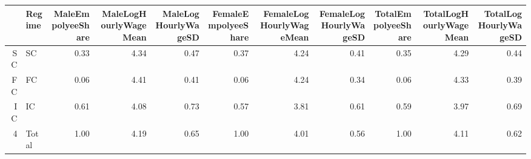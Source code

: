 \begin{table}[ht]
\centering
\begin{tabular}{rlrrrrrrrrr}
  \hline
 & Regime & MaleEmpolyeeShare & MaleLogHourlyWageMean & MaleLogHourlyWageSD & FemaleEmpolyeeShare & FemaleLogHourlyWageMean & FemaleLogHourlyWageSD & TotalEmpolyeeShare & TotalLogHourlyWageMean & TotalLogHourlyWageSD \\ 
  \hline
SC & SC & 0.33 & 4.34 & 0.47 & 0.37 & 4.24 & 0.41 & 0.35 & 4.29 & 0.44 \\ 
  FC & FC & 0.06 & 4.41 & 0.41 & 0.06 & 4.24 & 0.34 & 0.06 & 4.33 & 0.39 \\ 
  IC & IC & 0.61 & 4.08 & 0.73 & 0.57 & 3.81 & 0.61 & 0.59 & 3.97 & 0.69 \\ 
  4 & Total & 1.00 & 4.19 & 0.65 & 1.00 & 4.01 & 0.56 & 1.00 & 4.11 & 0.62 \\ 
   \hline
\end{tabular}
\end{table}
